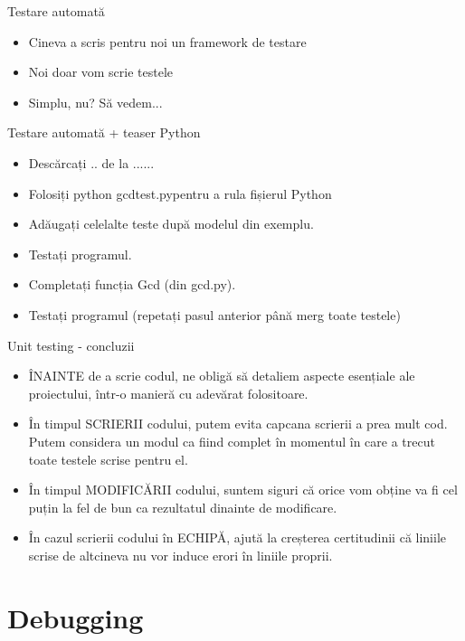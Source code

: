 \documentclass{beamer}
\begin{document}
\begin{frame}{Testare automată}
\begin{itemize}
\item Cineva a scris pentru noi un framework de testare
\item \pause Noi doar vom scrie testele
\item \pause Simplu, nu? \pause Să vedem...
\end{itemize}
\end{frame}

\begin{frame}{Testare automată + teaser Python}
\begin{itemize}
\item Descărcați .. de la ......
\item Folosiți \linebreak python gcdtest.py\linebreak pentru a rula fișierul Python
\item \pause Adăugați celelalte teste după modelul din exemplu.
\item \pause Testați programul.
\item \pause Completați funcția Gcd (din gcd.py).
\item \pause Testați programul (repetați pasul anterior până merg toate testele)
\end{itemize}
\end{frame}

\begin{frame}{Unit testing - concluzii}
\begin{itemize}
\item ÎNAINTE de a scrie codul, ne obligă să detaliem aspecte esențiale ale proiectului, într-o manieră cu adevărat folositoare.
\item \pause În timpul SCRIERII codului, putem evita capcana scrierii a prea mult cod. \pause Putem considera un modul ca fiind complet în momentul în care a trecut toate testele scrise pentru el.
\item \pause În timpul MODIFICĂRII codului, suntem siguri că orice vom obține va fi cel puțin la fel de bun ca rezultatul dinainte de modificare.
\item \pause În cazul scrierii codului în ECHIPĂ, ajută la creșterea certitudinii că liniile scrise de altcineva nu vor induce erori în liniile proprii.
\end{itemize}
\end{frame}

\section{Debugging}
\frame{\tableofcontents[currentsection]}
\end{document}
